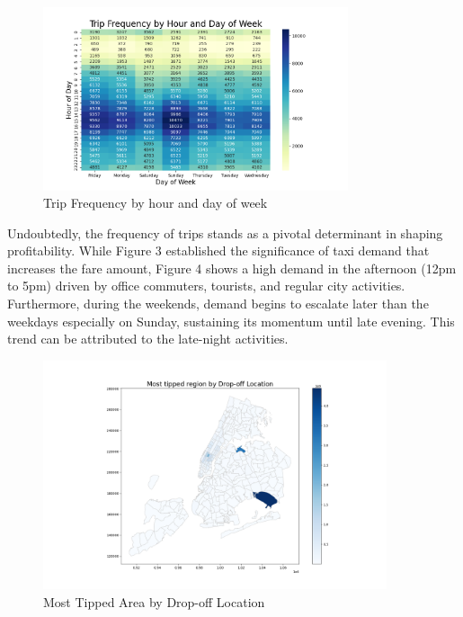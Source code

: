 \documentclass[11pt]{article}
\begin{document}
\begin{figure}[H]
    \includegraphics[width=0.8\textwidth]{plots/trip frequency by hour and day of week.png}
    \centering
    \caption{Trip Frequency by hour and day of week} %
\end{figure}

Undoubtedly, the frequency of trips stands as a pivotal determinant in shaping profitability. While Figure 3 established the significance of taxi demand that increases the fare amount, Figure 4 shows a high demand in the afternoon (12pm to 5pm) driven by office commuters, tourists, and regular city activities. Furthermore, during the weekends, demand begins to escalate later than the  weekdays especially on Sunday, sustaining its momentum until late evening. This trend can be attributed to the late-night activities.

\begin{figure}[H]
    \includegraphics[width=0.9\textwidth]{plots/most tip by drop-off location.png}
    \centering
    \caption{Most Tipped Area by Drop-off Location} %
\end{figure}
\end{document}
